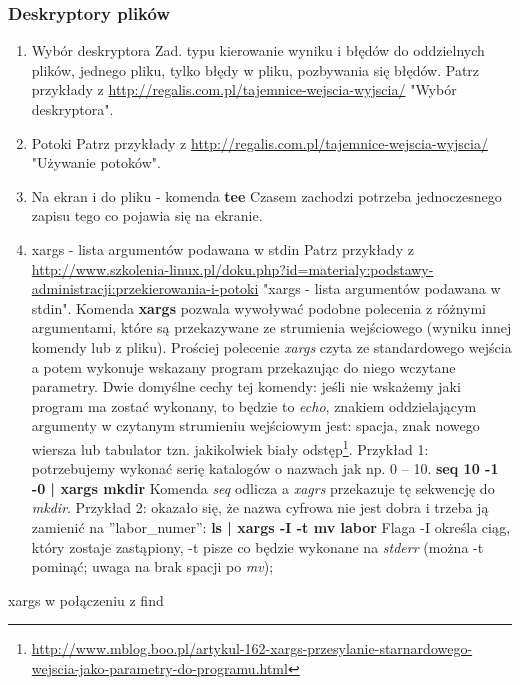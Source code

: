 \documentclass[a4paper,titlepage,12pt]{mwart}
\begin{document}
\subsubsection{Deskryptory plików}
\begin{enumerate}
\item{Wybór deskryptora}
Zad. typu kierowanie wyniku i błędów do oddzielnych plików, jednego pliku, tylko błędy w pliku, pozbywania się błędów. Patrz przykłady z \url{http://regalis.com.pl/tajemnice-wejscia-wyjscia/} "Wybór deskryptora".
\item{Potoki}
Patrz przykłady z \url{http://regalis.com.pl/tajemnice-wejscia-wyjscia/} "Używanie potoków".
\item{Na ekran i do pliku - komenda \textbf{tee}}
Czasem zachodzi potrzeba jednoczesnego zapisu tego co pojawia się na ekranie.
\item{xargs - lista argumentów podawana w stdin}
Patrz przykłady z \url{http://www.szkolenia-linux.pl/doku.php?id=materialy:podstawy-administracji:przekierowania-i-potoki} "xargs - lista argumentów podawana w stdin".
Komenda \textbf{xargs} pozwala wywoływać podobne polecenia z różnymi argumentami, które są przekazywane ze strumienia wejściowego (wyniku innej komendy lub z pliku). Prościej polecenie \textit{xargs} czyta ze standardowego wejścia a potem wykonuje wskazany program przekazując do niego wczytane parametry. Dwie domyślne cechy tej komendy: jeśli nie wskażemy jaki program ma zostać wykonany, to będzie to \textit{echo}, znakiem oddzielającym argumenty w czytanym strumieniu wejściowym jest: spacja, znak nowego wiersza lub tabulator tzn. jakikolwiek biały odstęp\footnote{\url{http://www.mblog.boo.pl/artykul-162-xargs-przesylanie-starnardowego-wejscia-jako-parametry-do-programu.html}}.
Przykład 1: potrzebujemy wykonać serię katalogów o nazwach jak np. 0 -- 10.\newline
\textbf{seq 10 -1 -0 | xargs mkdir}\newline
Komenda \textit{seq} odlicza a \textit{xagrs} przekazuje tę sekwencję do \textit{mkdir}.
Przykład 2: okazało się, że nazwa cyfrowa nie jest dobra i trzeba ją zamienić na ''labor_numer'':\newline
\textbf{ls | xargs -I {} -t mv {} labor{}}\newline
Flaga -I określa ciąg, który zostaje zastąpiony, -t pisze co będzie wykonane na \textit{stderr} (można -t pominąć; uwaga na brak spacji po \textit{mv}); 
\end{enumerate}
\item{xargs w połączeniu z find}
\end{document}
